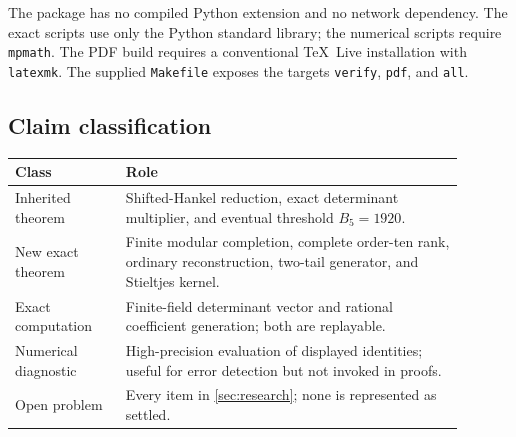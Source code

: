 The package has no compiled Python extension and no network dependency.
The exact scripts use only the Python standard library; the numerical
scripts require \texttt{mpmath}.  The PDF build requires a conventional
\TeX\ Live installation with \texttt{latexmk}.  The supplied
\texttt{Makefile} exposes the targets \texttt{verify}, \texttt{pdf},
and \texttt{all}.

\subsection{Claim classification}

\begin{center}
\begin{tabular}{p{0.22\linewidth}p{0.67\linewidth}}
\toprule
Class&Role\\
\midrule
Inherited theorem&Shifted-Hankel reduction, exact determinant multiplier,
and eventual threshold $B_5=1920$.\\
New exact theorem&Finite modular completion, complete order-ten rank,
ordinary reconstruction, two-tail generator, and Stieltjes kernel.\\
Exact computation&Finite-field determinant vector and rational
coefficient generation; both are replayable.\\
Numerical diagnostic&High-precision evaluation of displayed identities;
useful for error detection but not invoked in proofs.\\
Open problem&Every item in \cref{sec:research}; none is represented as
settled.\\
\bottomrule
\end{tabular}
\end{center}

